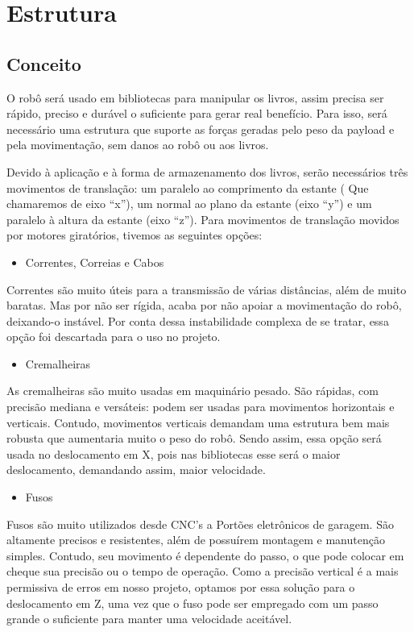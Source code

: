\section[Estrutura] {Estrutura}
\subsection{Conceito}

O robô será usado em bibliotecas para manipular os livros, assim precisa ser rápido, preciso e durável o suficiente para gerar real benefício. Para isso, será necessário uma estrutura que suporte as forças geradas pelo peso da payload e pela movimentação, sem danos ao robô ou aos livros.

Devido à aplicação e à forma de armazenamento dos livros, serão necessários três movimentos de translação: um paralelo ao comprimento da estante ( Que chamaremos de eixo “x”), um normal ao plano da estante (eixo “y”) e um paralelo à altura da estante (eixo “z”). Para movimentos de translação movidos por motores giratórios, tivemos as seguintes opções:

\begin{itemize}
\item{Correntes, Correias e Cabos}
\end{itemize}

Correntes são muito úteis para a transmissão de várias distâncias, além de muito baratas. Mas por não ser rígida, acaba por não apoiar a movimentação do robô, deixando-o instável. Por conta dessa instabilidade complexa de se tratar, essa opção foi descartada para o uso no projeto.  

\begin{itemize}
\item{Cremalheiras}
\end{itemize}

As cremalheiras são muito usadas em maquinário pesado. São rápidas, com precisão mediana e versáteis: podem ser usadas para movimentos horizontais e verticais. Contudo, movimentos verticais demandam uma estrutura bem mais robusta que aumentaria muito o peso do robô. Sendo assim, essa opção será usada no deslocamento em X, pois nas bibliotecas esse será o maior deslocamento, demandando assim, maior velocidade.

\begin{itemize}
\item{Fusos}
\end{itemize}

Fusos são muito utilizados desde CNC’s a Portões eletrônicos de garagem. São altamente precisos e resistentes, além de possuírem montagem e manutenção simples. Contudo, seu movimento é dependente do passo, o que pode colocar em cheque sua precisão ou o tempo de operação. Como a precisão vertical é a mais permissiva de erros em nosso projeto, optamos por essa solução para o deslocamento em Z, uma vez que o fuso pode ser empregado com um passo grande o suficiente para manter uma velocidade aceitável.

